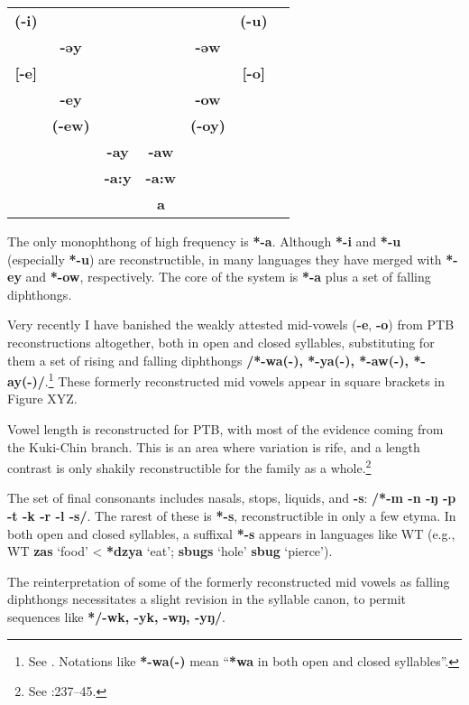 \begin{table}[h!]
\centering
\begin{tabular}{ccccccc}
\textbf{(-i)} & & & & & \textbf{(-u)}\\
 & \textbf{-əy} & & & \textbf{-əw} & \\
\textbf{[-e]} & & & & & \textbf{[-o]}\\
 & \textbf{-ey} & & & \textbf{-ow} & \\
 & \textbf{(-ew)} & & & \textbf{(-oy)} & \\
 & & \textbf{-ay} & \textbf{-aw} & & \\
 & & \textbf{-a:y} & \textbf{-a:w} & & \\
 & & & \textbf{a} & & & \\
\end{tabular}
\end{table}

The only monophthong of high frequency is \textbf{*-a}. Although \textbf{*-i} and \textbf{*-u} (especially \textbf{*-u}) are reconstructible, in many languages they have merged with \textbf{*-ey} and \textbf{*-ow}, respectively. The core of the system is \textbf{*-a} plus a set of falling diphthongs.

Very recently I have banished the weakly attested mid-vowels (\textbf{-e}, \textbf{-o}) from PTB reconstructions altogether, both in open and closed syllables, substituting for them a set of rising and falling diphthongs \textbf{/*-wa(-), *-ya(-), *-aw(-), *-ay(-)/}.\footnote{See \citealt{JAM-PTBMV}. Notations like \textbf{*-wa(-)} mean “\textbf{*wa} in both open and closed syllables”.} These formerly reconstructed mid vowels appear in square brackets in Figure XYZ.

Vowel length is reconstructed for PTB, with most of the evidence coming from the Kuki-Chin branch. This is an area where variation is rife, and a length contrast is only shakily reconstructible for the family as a whole.\footnote{See \textit{}:237–45.}

The set of final consonants includes nasals, stops, liquids, and \textbf{-s}: \textbf{/*-m -n -ŋ -p -t -k -r -l -s/}. The rarest of these is \textbf{*-s}, reconstructible in only a few etyma. In both open and closed syllables, a suffixal \textbf{*-s} appears in languages like WT (e.g., WT \textbf{zas} ‘food’ < \textbf{*dzya} ‘eat’; \textbf{sbugs} ‘hole’  \textbf{sbug} ‘pierce’).

The reinterpretation of some of the formerly reconstructed mid vowels as falling diphthongs necessitates a slight revision in the syllable canon, to permit sequences like \textbf{*/-wk, -yk, -wŋ, -yŋ/}.

